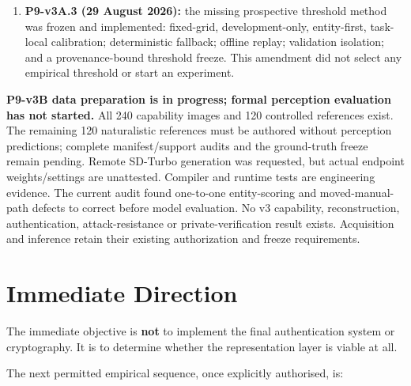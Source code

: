 \documentclass[11pt,a4paper]{article}
\begin{document}
\begin{enumerate}
  \item \textbf{P9-v3A.3 (29 August 2026):} the missing prospective threshold method was frozen and implemented: fixed-grid, development-only, entity-first, task-local calibration; deterministic fallback; offline replay; validation isolation; and a provenance-bound threshold freeze. This amendment did not select any empirical threshold or start an experiment.
\end{enumerate}

\begin{statusbox}
\textbf{P9-v3B data preparation is in progress; formal perception evaluation has not started.} All 240 capability images and 120 controlled references exist. The remaining 120 naturalistic references must be authored without perception predictions; complete manifest/support audits and the ground-truth freeze remain pending. Remote SD-Turbo generation was requested, but actual endpoint weights/settings are unattested. Compiler and runtime tests are engineering evidence. The current audit found one-to-one entity-scoring and moved-manual-path defects to correct before model evaluation. No v3 capability, reconstruction, authentication, attack-resistance or private-verification result exists. Acquisition and inference retain their existing authorization and freeze requirements.
\end{statusbox}

\section{Immediate Direction}

The immediate objective is \textbf{not} to implement the final authentication system or cryptography. It is to determine whether the representation layer is viable at all.

The next permitted empirical sequence, once explicitly authorised, is:
\end{document}
